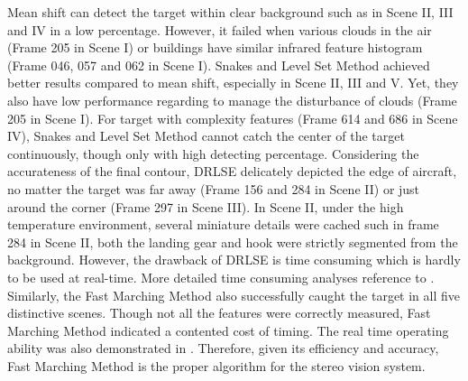 \documentclass[letterpaper, 10 pt, conference]{ieeeconf}  %
\begin{document}
Mean shift can detect the target within clear background such as in Scene II, III and IV in a low percentage. However, it failed when various clouds in the air (Frame 205 in Scene I) or buildings have similar infrared feature histogram (Frame 046, 057 and 062 in Scene I). Snakes and Level Set Method achieved better results compared to mean shift, especially in Scene II, III and V. Yet, they also have low performance regarding to manage the disturbance of clouds (Frame 205 in Scene I). For target with complexity features (Frame 614 and 686 in Scene IV), Snakes and Level Set Method cannot catch the center of the target continuously, though only with high detecting percentage. Considering the accurateness of the final contour, DRLSE delicately depicted the edge of aircraft, no matter the target was far away (Frame 156 and 284 in Scene II) or just around the corner (Frame 297 in Scene III). In Scene II, under the high temperature environment, several miniature details were cached such in frame 284 in Scene II, 
both the landing gear and hook were strictly segmented from the background. However, the drawback of DRLSE is time consuming which is hardly to be used at real-time. More detailed time consuming analyses reference to  \cite{Li2005}. Similarly, the Fast Marching Method also successfully caught the target in all five distinctive scenes. Though not all the features were correctly measured, Fast Marching Method indicated a contented cost of timing. The real time operating ability was also demonstrated in \cite{johnson2007real}. Therefore, given its efficiency and accuracy, Fast Marching Method is the proper algorithm for the stereo vision system.
\end{document}
